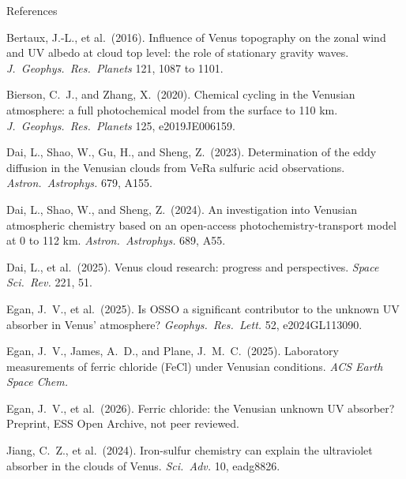 \documentclass[aspectratio=169,10pt,t,usepdftitle=false]{beamer}
\begin{document}
\begin{frame}{References}
  \scriptsize
  \renewcommand{\arraystretch}{1.0}
  \setlength{\parskip}{1.2mm}
  \raggedright
  Bertaux, J.-L., et al.\ (2016). Influence of Venus topography on the zonal wind and UV albedo at cloud top level: the role of stationary gravity waves. \emph{J.\ Geophys.\ Res.\ Planets} 121, 1087 to 1101.\par
  Bierson, C.\ J., and Zhang, X.\ (2020). Chemical cycling in the Venusian atmosphere: a full photochemical model from the surface to 110 km. \emph{J.\ Geophys.\ Res.\ Planets} 125, e2019JE006159.\par
  Dai, L., Shao, W., Gu, H., and Sheng, Z.\ (2023). Determination of the eddy diffusion in the Venusian clouds from VeRa sulfuric acid observations. \emph{Astron.\ Astrophys.} 679, A155.\par
  Dai, L., Shao, W., and Sheng, Z.\ (2024). An investigation into Venusian atmospheric chemistry based on an open-access photochemistry-transport model at 0 to 112 km. \emph{Astron.\ Astrophys.} 689, A55.\par
  Dai, L., et al.\ (2025). Venus cloud research: progress and perspectives. \emph{Space Sci.\ Rev.} 221, 51.\par
  Egan, J.\ V., et al.\ (2025). Is OSSO a significant contributor to the unknown UV absorber in Venus' atmosphere? \emph{Geophys.\ Res.\ Lett.} 52, e2024GL113090.\par
  Egan, J.\ V., James, A.\ D., and Plane, J.\ M.\ C.\ (2025). Laboratory measurements of ferric chloride (FeCl) under Venusian conditions. \emph{ACS Earth Space Chem.}\par
  Egan, J.\ V., et al.\ (2026). Ferric chloride: the Venusian unknown UV absorber? Preprint, ESS Open Archive, not peer reviewed.\par
  Jiang, C.\ Z., et al.\ (2024). Iron-sulfur chemistry can explain the ultraviolet absorber in the clouds of Venus. \emph{Sci.\ Adv.} 10, eadg8826.\par
\end{frame}
\end{document}
